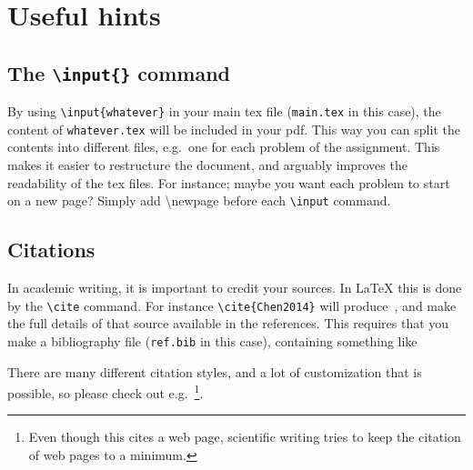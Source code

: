\section{Useful hints}
\subsection{The \texttt{\textbackslash{input}\{\}} command}
By using \texttt{\textbackslash{input}\{whatever\}} in your main tex file (\texttt{main.tex} in this case), the content of \texttt{whatever.tex} will be included in your pdf. This way you can split the contents into different files, e.g.~one for each problem of the assignment. This makes it easier to restructure the document, and arguably improves the readability of the tex files. For instance; maybe you want each problem to start on a new page? Simply add \textbackslash{newpage} before each \texttt{\textbackslash{input}} command.

\subsection{Citations}
In academic writing, it is important to credit your sources. In \LaTeX{} this is done by the \texttt{\textbackslash{cite}} command. For instance \texttt{\textbackslash{cite}\{Chen2014\}} will produce~\cite{Chen2014}, and make the full details of that source available in the references. This requires that you make a bibliography file (\texttt{ref.bib} in this case), containing something like


There are many different citation styles, and a lot of customization that is possible, so please check out e.g.~\cite{WikibookLatex}\footnote{Even though this cites a web page, scientific writing tries to keep the citation of web pages to a minimum.}.

